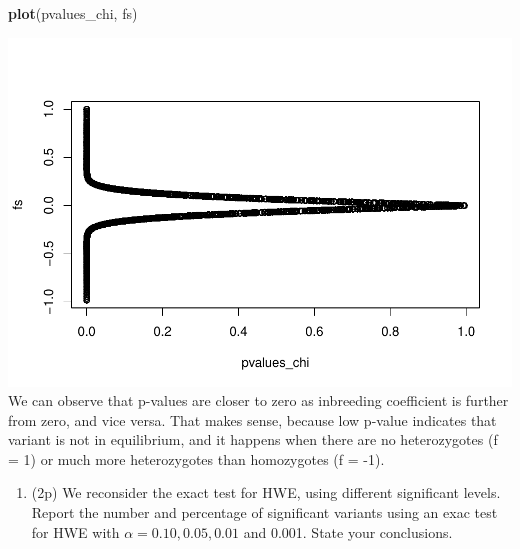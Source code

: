 \documentclass[
]{article}
\newenvironment{Shaded}{\begin{snugshade}}{\end{snugshade}}
\newcommand{\KeywordTok}[1]{\textcolor[rgb]{0.13,0.29,0.53}{\textbf{#1}}}
\newcommand{\NormalTok}[1]{#1}
\providecommand{\tightlist}{%
  \setlength{\itemsep}{0pt}\setlength{\parskip}{0pt}}
\begin{document}
\begin{Shaded}
\begin{Highlighting}[]
\KeywordTok{plot}\NormalTok{(pvalues_chi, fs)}
\end{Highlighting}
\end{Shaded}

\includegraphics{P022020_HWE_files/figure-latex/17th-1.pdf} We can
observe that p-values are closer to zero as inbreeding coefficient is
further from zero, and vice versa. That makes sense, because low p-value
indicates that variant is not in equilibrium, and it happens when there
are no heterozygotes (f = 1) or much more heterozygotes than homozygotes
(f = -1).

\begin{enumerate}
\def\labelenumi{\arabic{enumi}.}
\setcounter{enumi}{17}
\tightlist
\item
  (2p) We reconsider the exact test for HWE, using different significant
  levels. Report the number and percentage of significant variants using
  an exac test for HWE with \(\alpha = 0.10, 0.05, 0.01\) and 0.001.
  State your conclusions.
\end{enumerate}
\end{document}
